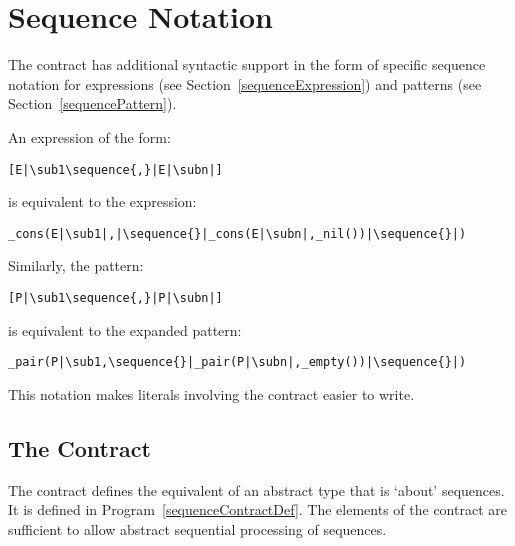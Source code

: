 \section{Sequence Notation}
\label{sequenceNotation}
The  contract has additional syntactic support in the form of specific sequence notation for expressions (see Section~\vref{sequenceExpression}) and patterns (see Section~\vref{sequencePattern}).

An expression of the form:
\begin{lstlisting}[escapechar=|]
[E|\sub1\sequence{,}|E|\subn|]
\end{lstlisting}
is equivalent to the expression:
\begin{lstlisting}[escapechar=|]
_cons(E|\sub1|,|\sequence{}|_cons(E|\subn|,_nil())|\sequence{}|)
\end{lstlisting}
Similarly, the pattern:
\begin{lstlisting}[escapechar=|]
[P|\sub1\sequence{,}|P|\subn|]
\end{lstlisting}is equivalent to the expanded pattern:
\begin{lstlisting}[escapechar=|]
_pair(P|\sub1,\sequence{}|_pair(P|\subn|,_empty())|\sequence{}|)
\end{lstlisting}
This notation makes literals involving the  contract easier to write.

\subsection{The  Contract}
\label{sequenceContract}
The  contract defines the equivalent of an abstract type that is `about' sequences. It is defined in Program~\vref{sequenceContractDef}. The elements of the  contract are sufficient to allow abstract sequential processing of sequences.

